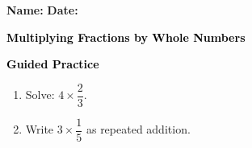 \documentclass[12pt, letterpaper, fleqn]{article}
\begin{document}
\textbf{Name:} \underline{\hspace{5cm}}
\hfill
\textbf{Date:} \underline{\hspace{3cm}}\\

\begin{tcolorbox}[colback=customteal!20]
    \large\textcolor{black}{\textbf{Multiplying Fractions by Whole Numbers}}
\end{tcolorbox}
\newpage
\begin{tcolorbox}[colback=customteal!20]
    \large\textcolor{black}{\textbf{Guided Practice}}
\end{tcolorbox}
\begin{enumerate}[itemsep=3.5cm, leftmargin=0.6cm]
\item Solve: $4 \times \dfrac{2}{3}$.
\vspace{3cm}
\item Write $3 \times \dfrac{1}{5}$ as repeated addition.
\end{enumerate}
\end{document}
